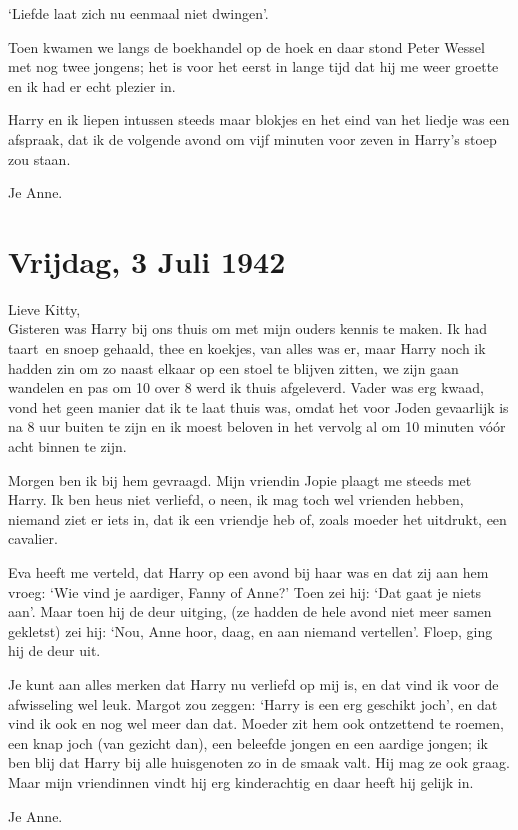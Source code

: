 \documentclass{book}
\begin{document}
`Liefde laat zich nu eenmaal niet dwingen'.

Toen kwamen we langs de boekhandel op de hoek en daar stond Peter Wessel
met nog twee jongens; het is voor het eerst in lange tijd dat hij me
weer groette en ik had er echt plezier in.

Harry en ik liepen intussen steeds maar blokjes en het eind van het
liedje was een afspraak, dat ik de volgende avond om vijf minuten voor
zeven in Harry's stoep zou staan.

Je Anne.

\chapter{Vrijdag, 3 Juli 1942}

Lieve Kitty,\\Gisteren was Harry bij ons thuis om met mijn ouders kennis
te maken. Ik had taart~en snoep gehaald, thee en koekjes, van alles was
er, maar Harry noch ik hadden zin om zo naast elkaar op een stoel te
blijven zitten, we zijn gaan wandelen en pas om 10 over 8 werd ik thuis
afgeleverd. Vader was erg kwaad, vond het geen manier dat ik te laat
thuis was, omdat het voor Joden gevaarlijk is na 8 uur buiten te zijn en
ik moest beloven in het vervolg al om 10 minuten vóór acht binnen te
zijn.

Morgen ben ik bij hem gevraagd. Mijn vriendin Jopie plaagt me steeds met
Harry. Ik ben heus niet verliefd, o neen, ik mag toch wel vrienden
hebben, niemand ziet er iets in, dat ik een vriendje heb of, zoals
moeder het uitdrukt, een cavalier.

Eva heeft me verteld, dat Harry op een avond bij haar was en dat zij aan
hem vroeg: `Wie vind je aardiger, Fanny of Anne?' Toen zei hij: `Dat
gaat je niets aan'. Maar toen hij de deur uitging, (ze hadden de hele
avond niet meer samen gekletst) zei hij: `Nou, Anne hoor, daag, en aan
niemand vertellen'. Floep, ging hij de deur uit.

Je kunt aan alles merken dat Harry nu verliefd op mij is, en dat vind ik
voor de afwisseling wel leuk. Margot zou zeggen: `Harry is een erg
geschikt joch', en dat vind ik ook en nog wel meer dan dat. Moeder zit
hem ook ontzettend te roemen, een knap joch (van gezicht dan), een
beleefde jongen en een aardige jongen; ik ben blij dat Harry bij alle
huisgenoten zo in de smaak valt. Hij mag ze ook graag. Maar mijn
vriendinnen vindt hij erg kinderachtig en daar heeft hij gelijk in.

Je Anne.
\end{document}
